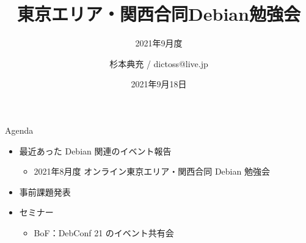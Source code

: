 \title{東京エリア・関西合同Debian勉強会}
\subtitle{2021年9月度} %
\author{杉本典充 / dictoss@live.jp}
\date{2021年9月18日}



\begin{frame}
\titlepage{}
\end{frame}


\begin{frame}{Agenda}
 \begin{minipage}[t]{0.45\hsize}
  \begin{itemize}
  \item 最近あった Debian 関連のイベント報告
    \begin{itemize}
    \item 2021年8月度 オンライン東京エリア・関西合同 Debian 勉強会
    \end{itemize}
  \item 事前課題発表
  \end{itemize}
 \end{minipage}
 \begin{minipage}[t]{0.45\hsize}
   \begin{itemize}
   \item セミナー
     \begin{itemize}
      \item BoF：DebConf 21 のイベント共有会
     \end{itemize}
  \end{itemize}
 \end{minipage}
\end{frame}

